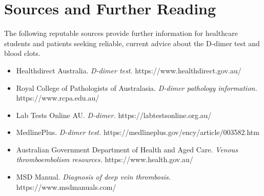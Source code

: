 \section*{Sources and Further Reading}
The following reputable sources provide further information for healthcare students and patients seeking reliable, current advice about the D-dimer test and blood clots.

\begin{itemize}
    \item Healthdirect Australia. \textit{D-dimer test.} https://www.healthdirect.gov.au/
    \item Royal College of Pathologists of Australasia. \textit{D-dimer pathology information.} https://www.rcpa.edu.au/
    \item Lab Tests Online AU. \textit{D-dimer.} https://labtestsonline.org.au/
    \item MedlinePlus. \textit{D-dimer test.} https://medlineplus.gov/ency/article/003582.htm
    \item Australian Government Department of Health and Aged Care. \textit{Venous thromboembolism resources.} https://www.health.gov.au/
    \item MSD Manual. \textit{Diagnosis of deep vein thrombosis.} https://www.msdmanuals.com/
\end{itemize}
